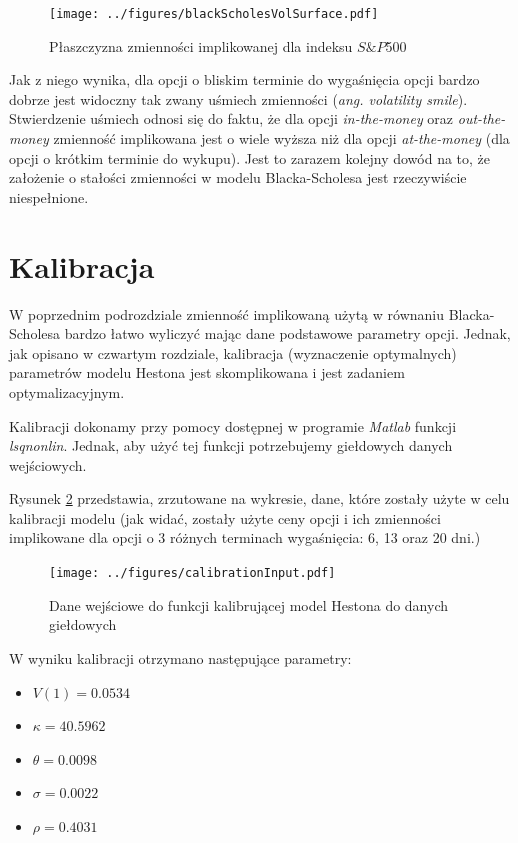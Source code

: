 \documentclass{pracamgr}
\begin{document}
\begin{figure}
  \centering
  \texttt{[image: ../figures/blackScholesVolSurface.pdf]}
  \caption{Płaszczyzna zmienności implikowanej dla indeksu $S\&P$500}
  \label{fig:volatilitySurface}
\end{figure}

Jak z niego wynika, dla opcji o bliskim terminie do wygaśnięcia opcji bardzo dobrze jest widoczny
tak zwany uśmiech zmienności (\textit{ang. volatility smile}). Stwierdzenie uśmiech 
odnosi się do faktu, że dla opcji \textit{in-the-money} oraz \textit{out-the-money}
zmienność implikowana jest o wiele wyższa niż dla opcji \textit{at-the-money} (dla opcji o krótkim
terminie do wykupu).
Jest to zarazem kolejny dowód na to, że założenie o stałości zmienności w modelu Blacka-Scholesa jest rzeczywiście niespełnione.


\section{Kalibracja}

W poprzednim podrozdziale zmienność implikowaną użytą w równaniu Blacka-Scholesa bardzo łatwo 
wyliczyć mając dane podstawowe parametry opcji. Jednak, jak opisano w czwartym rozdziale, 
kalibracja (wyznaczenie optymalnych) parametrów modelu Hestona jest skomplikowana i jest
zadaniem optymalizacyjnym.  

Kalibracji dokonamy przy pomocy dostępnej w programie \textit{Matlab} funkcji \textit{lsqnonlin}.
Jednak, aby użyć tej funkcji potrzebujemy giełdowych danych wejściowych.


Rysunek \ref{fig:calibration} przedstawia, zrzutowane na wykresie, dane, które
zostały użyte w celu kalibracji modelu (jak widać, zostały użyte ceny 
opcji i ich zmienności implikowane dla opcji o 3 różnych terminach wygaśnięcia: 
6, 13 oraz 20 dni.)

\begin{figure}
  \centering
  \texttt{[image: ../figures/calibrationInput.pdf]}
  \caption{Dane wejściowe do funkcji kalibrującej model Hestona do danych giełdowych}
  \label{fig:calibration}
\end{figure}

W wyniku kalibracji otrzymano następujące parametry:


\begin{itemize}
  \item $V(1) = 0.0534 $
  \item $\kappa = 40.5962$
  \item $\theta = 0.0098$
  \item $\sigma = 0.0022$
  \item $\rho = 0.4031$
\end{itemize}
\end{document}
